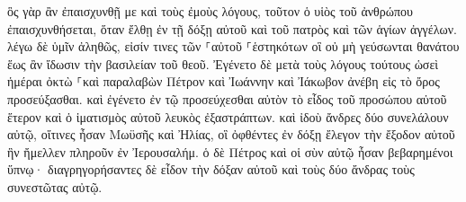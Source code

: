 \documentclass{openreader}
\begin{document}
ὃς γὰρ ἂν ἐπαισχυνθῇ με καὶ τοὺς ἐμοὺς λόγους, τοῦτον ὁ υἱὸς τοῦ ἀνθρώπου ἐπαισχυνθήσεται, ὅταν ἔλθῃ ἐν τῇ δόξῃ αὐτοῦ καὶ τοῦ πατρὸς καὶ τῶν ἁγίων ἀγγέλων. 
λέγω δὲ ὑμῖν ἀληθῶς, εἰσίν τινες τῶν ⸀αὐτοῦ ⸀ἑστηκότων οἳ οὐ μὴ γεύσωνται θανάτου ἕως ἂν ἴδωσιν τὴν βασιλείαν τοῦ θεοῦ. 
Ἐγένετο δὲ μετὰ τοὺς λόγους τούτους ὡσεὶ ἡμέραι ὀκτὼ ⸀καὶ παραλαβὼν Πέτρον καὶ Ἰωάννην καὶ Ἰάκωβον ἀνέβη εἰς τὸ ὄρος προσεύξασθαι. 
καὶ ἐγένετο ἐν τῷ προσεύχεσθαι αὐτὸν τὸ εἶδος τοῦ προσώπου αὐτοῦ ἕτερον καὶ ὁ ἱματισμὸς αὐτοῦ λευκὸς ἐξαστράπτων. 
καὶ ἰδοὺ ἄνδρες δύο συνελάλουν αὐτῷ, οἵτινες ἦσαν Μωϋσῆς καὶ Ἠλίας, 
οἳ ὀφθέντες ἐν δόξῃ ἔλεγον τὴν ἔξοδον αὐτοῦ ἣν ἤμελλεν πληροῦν ἐν Ἰερουσαλήμ. 
ὁ δὲ Πέτρος καὶ οἱ σὺν αὐτῷ ἦσαν βεβαρημένοι ὕπνῳ· διαγρηγορήσαντες δὲ εἶδον τὴν δόξαν αὐτοῦ καὶ τοὺς δύο ἄνδρας τοὺς συνεστῶτας αὐτῷ. 
\end{document}
